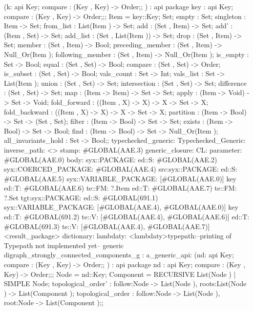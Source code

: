 (k:
api {
    Key;
    compare : (Key , Key) -> Order;};
)
:
api {   package key
          : api {
                Key;
                compare : (Key , Key) -> Order;};;
    Item  = key::Key;
    Set;
    empty : Set;
    singleton : Item -> Set;
    from_list : List(Item ) -> Set;
    add : (Set , Item) -> Set;
    add' : (Item , Set) -> Set;
    add_list : (Set , List(Item )) -> Set;
    drop : (Set , Item) -> Set;
    member : (Set , Item) -> Bool;
    preceding_member : (Set , Item) -> Null_Or(Item );
    following_member : (Set , Item) -> Null_Or(Item );
    is_empty : Set -> Bool;
    equal : (Set , Set) -> Bool;
    compare : (Set , Set) -> Order;
    is_subset : (Set , Set) -> Bool;
    vals_count : Set -> Int;
    vals_list : Set -> List(Item );
    union : (Set , Set) -> Set;
    intersection : (Set , Set) -> Set;
    difference : (Set , Set) -> Set;
    map : (Item -> Item) -> Set -> Set;
    apply : (Item -> Void) -> Set -> Void;
    fold_forward : ((Item , X) -> X) -> X -> Set -> X;
    fold_backward : ((Item , X) -> X) -> X -> Set -> X;
    partition : (Item -> Bool) -> Set -> (Set , Set);
    filter : (Item -> Bool) -> Set -> Set;
    exists : (Item -> Bool) -> Set -> Bool;
    find : (Item -> Bool) -> Set -> Null_Or(Item );
    all_invariants_hold : Set -> Bool;};
typechecked_generic:
Typechecked_Generic:
inverse_path: <>
stamp: #GLOBAL(AAE.3)
generic_closure:
CL:
parameter: #GLOBAL(AAE.0)
body: syx::PACKAGE:
        ed::S: #GLOBAL(AAE.2)
            syx::COERCED_PACKAGE:
                #GLOBAL(AAE.4)
                 src:syx::PACKAGE:
                        ed::S: #GLOBAL(AAE.5) syx::VARIABLE_PACKAGE: [#GLOBAL(AAE.0)] key
                        ed::T: #GLOBAL(AAE.6) te::FM: ?.Item
                        ed::T: #GLOBAL(AAE.7) te::FM: ?.Set
                tgt:syx::PACKAGE:
                    ed::S: #GLOBAL(691.1)
                     syx::VARIABLE_PACKAGE:
                     [#GLOBAL(AAE.4), #GLOBAL(AAE.0)]
                     key
                    ed::T: #GLOBAL(691.2)
                     te::V:
                     [#GLOBAL(AAE.4), #GLOBAL(AAE.6)]
                    ed::T: #GLOBAL(691.3)
                     te::V:
                     [#GLOBAL(AAE.4), #GLOBAL(AAE.7)]
         <result_package>
dictionary:
lambdaty:
  <lambdaty>typepath:--printing of Typepath not implemented yet--
generic digraph_strongly_connected_components_g
:
a_generic_api:
(nd:
api {
    Key;
    compare : (Key , Key) -> Order;};
)
:
api {   package nd
          : api {
                Key;
                compare : (Key , Key) -> Order;};;
    Node  = nd::Key;
    Component  = RECURSIVE List(Node ) | SIMPLE Node;
    topological_order' : {follow:Node -> List(Node ), roots:List(Node )} -> List(Component );
    topological_order : {follow:Node -> List(Node ), root:Node} -> List(Component );};
